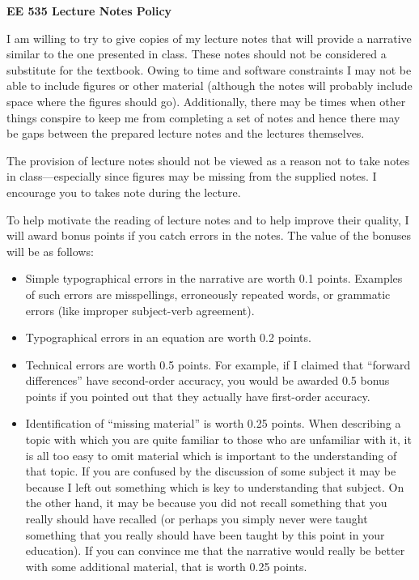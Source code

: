 \documentclass[12pt]{report}
\begin{document}
\begin{center}
{\bf\large
EE 535 Lecture Notes Policy
}
\end{center}

I am willing to try to give copies of my lecture notes that will
provide a narrative similar to the one presented in class.  These
notes should not be considered a substitute for the textbook.  Owing
to time and software constraints I may not be able to include figures
or other material (although the notes will probably include space
where the figures should go).  Additionally, there may be times when
other things conspire to keep me from completing a set of notes and
hence there may be gaps between the prepared lecture notes and the
lectures themselves.

The provision of lecture notes should not be viewed as a reason not to
take notes in class---especially since figures may be missing from
the supplied notes.  I encourage you to takes note during the lecture.

To help motivate the reading of lecture notes and to help improve
their quality, I will award bonus points if you catch errors in the
notes.  The value of the bonuses will be as follows:

\begin{itemize}
\item Simple typographical errors in the narrative are worth 0.1 points.
Examples of such errors are misspellings, erroneously repeated words,
or grammatic errors (like improper subject-verb agreement).
\item Typographical errors in an equation are worth 0.2 points.  
\item Technical errors are worth 0.5 points.  For example, if I
claimed that ``forward differences'' have second-order accuracy, you
would be awarded 0.5 bonus points if you pointed out that they
actually have first-order accuracy.
\item Identification of ``missing material'' is worth 0.25 points.
When describing a topic with which you are quite familiar to those who
are unfamiliar with it, it is all too easy to omit material which is
important to the understanding of that topic.  If you are confused by
the discussion of some subject it may be because I left out something
which is key to understanding that subject.  On the other hand, it may
be because you did not recall something that you really should have
recalled (or perhaps you simply never were taught something that you
really should have been taught by this point in your education).  If
you can convince me that the narrative would really be better with
some additional material, that is worth 0.25 points.
\end{itemize}
\end{document}
